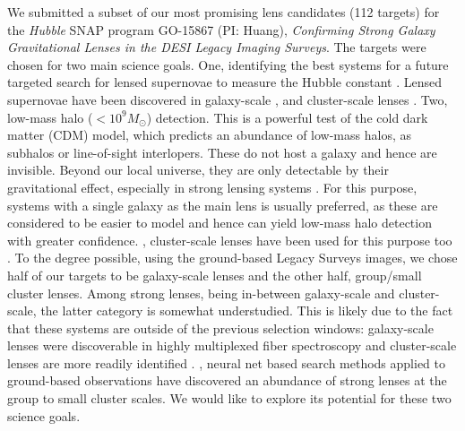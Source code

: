 We submitted a subset of our most promising lens candidates (112 targets) for the \emph{Hubble} SNAP program GO-15867 (PI: Huang),
\emph{Confirming Strong Galaxy Gravitational Lenses in the DESI Legacy Imaging Surveys}.
The targets were chosen for two main science goals.
One, identifying the best systems for a future targeted search for lensed supernovae to measure the Hubble constant \citep[e.g.,][]{shu2018a, shu2021a}.
Lensed supernovae have been discovered in galaxy-scale \citep[e.g.,][]{goobar2023a, pierel2023a}, 
and cluster-scale lenses \citep[e.g.,][]{kelly2023a, frye2023a}.
Two, low-mass halo ($<10^9 M_\odot$) detection.
This is a powerful test of the cold dark matter (CDM) model, which predicts an abundance of low-mass halos, as subhalos or line-of-sight interlopers.
These do not host a galaxy and hence are invisible.
Beyond our local universe, they  are only detectable by their gravitational effect, especially in strong lensing systems \citep[e.g.,][]{vegetti2010a, cagan-sengul2022a}.
For this purpose, systems with a single galaxy as the main lens is usually preferred,
as these are considered to be easier to model and hence can yield low-mass halo detection with greater confidence.
, cluster-scale lenses have been used for this purpose too \citep[e.g.,][]{dai2020a}. 
To the degree possible, using the ground-based Legacy Surveys images, we chose half of our \hst targets to be galaxy-scale lenses and  
the other half, group/small cluster lenses.
Among strong lenses, being in-between galaxy-scale and cluster-scale, the latter category is somewhat understudied.
This is likely due to the fact that these systems are outside of the previous selection windows: galaxy-scale lenses were discoverable in highly multiplexed fiber spectroscopy and cluster-scale lenses are more readily identified .
, neural net based search methods applied to ground-based observations have discovered an abundance of strong lenses at the group to small cluster scales.
We would like to explore its potential for these two science goals.


